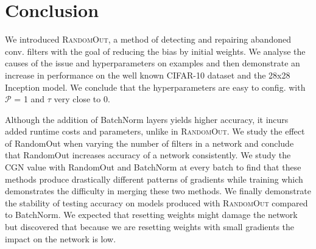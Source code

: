 \documentclass{article}
\begin{document}
	



\section{Conclusion}

We introduced \textsc{RandomOut}, a method of detecting and repairing abandoned conv. filters with the goal of reducing the bias by initial weights. We analyse the causes of the issue and hyperparameters on examples and then demonstrate an increase in performance on the well known CIFAR-10 dataset and the 28x28 Inception model. We conclude that the hyperparameters are easy to config. with $\mathcal{P}$ = 1 and $\tau$ very close to 0.

Although the addition of BatchNorm layers yields higher accuracy, it incurs added runtime costs and parameters, unlike in \textsc{RandomOut}. We study the effect of RandomOut when varying the number of filters in a network and conclude that RandomOut increases accuracy of a network consistently. We study the CGN value with RandomOut and BatchNorm at every batch to find that these methods produce drastically different patterns of gradients while training which demonstrates the difficulty in merging these two methods. We finally demonstrate the stability of testing accuracy on models produced with \textsc{RandomOut} compared to BatchNorm. We expected that resetting weights might damage the network but discovered that because we are resetting weights with small gradients the impact on the network is low.











{\fontsize{9}{9}\selectfont
 

}
\end{document}
